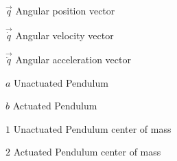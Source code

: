 \begin{Nomencl}
   	

   \item[$\vec{q}$] Angular position vector
   \item[$\vec{\dot{q}}$] Angular velocity vector
   \item[$\vec{\ddot{q}}$] Angular acceleration vector

   \item[$a$] 			Unactuated Pendulum
   \item[$b$]          	Actuated Pendulum
   \item[$1$]          	Unactuated Pendulum center of mass
   \item[$2$]          	Actuated Pendulum center of mass
\end{Nomencl}



\endinput
